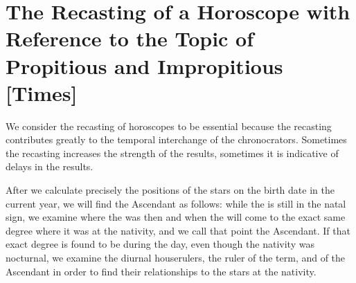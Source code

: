 \section{The Recasting of a Horoscope with Reference to the Topic of Propitious and Impropitious [Times]}

We consider the recasting of horoscopes to be essential because the recasting contributes greatly to the temporal interchange of the chronocrators. Sometimes the recasting increases the strength of the results, sometimes it is indicative of delays in the results. 

After we calculate precisely the positions of the stars on the birth date in the current year, we will find the Ascendant as follows: while the \Sun\xspace is still in the natal sign, we examine where the \Moon\xspace was then and when the \Moon\xspace will come to the exact same degree where it was at the nativity, and we call that point the Ascendant. If that exact degree is found to be during the day, even though the nativity was nocturnal, we examine the diurnal houserulers, the ruler of the term, and
of the Ascendant in order to find their relationships to the stars at the nativity.

\newpage